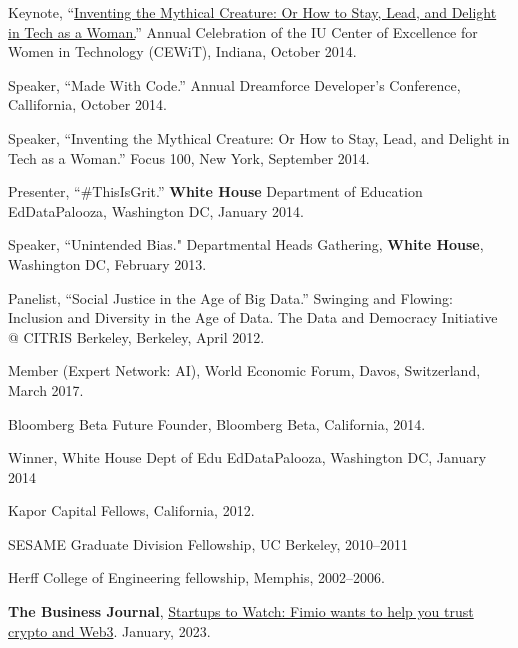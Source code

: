 \documentclass[11pt,article,oneside]{memoir}
\begin{document}
\ind Keynote, ``\href{https://www.youtube.com/watch?v=owXez6sIRbY&ab_channel=IUCEWIT}{Inventing the Mythical Creature: Or How to Stay, Lead, and Delight in Tech as a Woman.}'' Annual Celebration of the IU Center of Excellence for Women in Technology (CEWiT), Indiana, October 2014.

\ind Speaker, ``Made With Code.'' Annual Dreamforce Developer's Conference, Callifornia, October 2014.

\ind Speaker, ``Inventing the Mythical Creature: Or How to Stay, Lead, and Delight in Tech as a Woman.'' Focus 100, New York, September 2014.

\ind Presenter, ``\#ThisIsGrit.'' \textbf{White House} Department of Education EdDataPalooza, Washington DC, January 2014.

\ind Speaker, ``Unintended Bias." Departmental Heads Gathering, \textbf{White House}, Washington DC, February 2013.

\ind Panelist, ``Social Justice in the Age of Big Data.'' Swinging and Flowing: Inclusion and Diversity in the Age of Data. The Data and Democracy Initiative @ CITRIS Berkeley, Berkeley, April 2012.

\bigskip

\medskip

\ind Member (Expert Network: AI), World Economic Forum, Davos, Switzerland, March 2017.

\ind Bloomberg Beta Future Founder, Bloomberg Beta, California, 2014.

\ind Winner, White House Dept of Edu EdDataPalooza, Washington DC, January 2014

\ind Kapor Capital Fellows, California, 2012.

\ind SESAME Graduate Division Fellowship, UC Berkeley, 2010--2011

\ind Herff College of Engineering fellowship, Memphis, 2002--2006.

\bigskip

\medskip

\ind \textbf{The Business Journal}, \href{https://www.bizjournals.com/sanfrancisco/inno/stories/awards/2023/01/13/startups-to-watch.html}{Startups to Watch: Fimio wants to help you trust crypto and Web3}. January, 2023.
\end{document}
